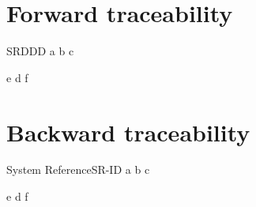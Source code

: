\documentclass[Main]{subfiles}
\begin{document}
\chapter{Forward traceability}

\begin{TraceForward}{SR}{DDD}
\TF
{a}
{b}
{c}

\TF
{e}
{d}
{f}

\end{TraceForward}

\chapter{Backward traceability}

\begin{TraceBackward}{System Reference}{SR-ID}
\TB
{a}
{b}
{c}

\TB
{e}
{d}
{f}

\end{TraceBackward}
\end{document}
